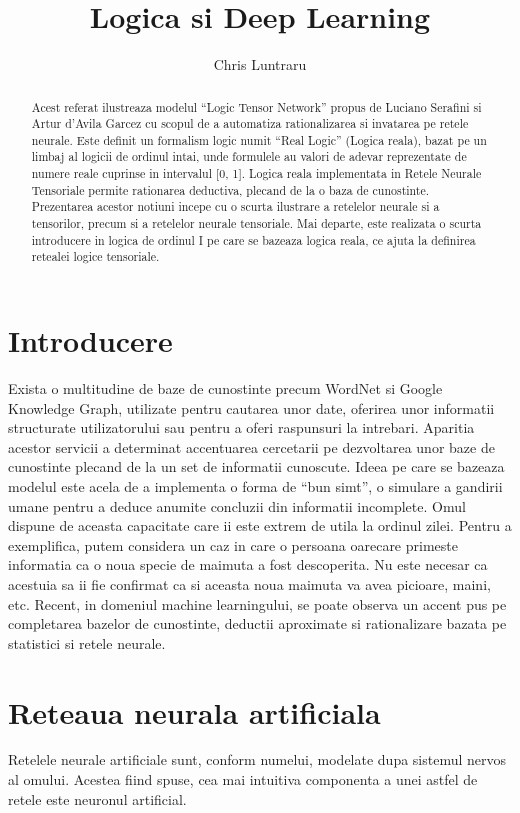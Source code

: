 \documentclass{article}
\begin{document}
\title{Logica si Deep Learning}
\author{Chris Luntraru}
\date{}
\maketitle

\begin{abstract}
Acest referat ilustreaza modelul ``Logic Tensor Network'' propus de Luciano Serafini si Artur d'Avila Garcez cu scopul de a automatiza rationalizarea si invatarea pe retele neurale. Este definit un formalism logic numit ``Real Logic'' (Logica reala), bazat pe un limbaj al logicii de ordinul intai, unde formulele au valori de adevar reprezentate de numere reale cuprinse in intervalul [0, 1]. Logica reala implementata in Retele Neurale Tensoriale permite rationarea deductiva, plecand de la o baza de cunostinte. Prezentarea acestor notiuni incepe cu o scurta ilustrare a retelelor neurale si a tensorilor, precum si a retelelor neurale tensoriale. Mai departe, este realizata o scurta introducere in logica de ordinul I pe care se bazeaza logica reala, ce ajuta la definirea retealei logice tensoriale.
\end{abstract}

\section{Introducere}
Exista o multitudine de baze de cunostinte precum WordNet si Google Knowledge Graph, utilizate pentru cautarea unor date, oferirea unor informatii structurate utilizatorului sau pentru a oferi raspunsuri la intrebari. Aparitia acestor servicii a determinat accentuarea cercetarii pe dezvoltarea unor baze de cunostinte plecand de la un set de informatii cunoscute. Ideea pe care se bazeaza modelul este acela de a implementa o forma de ``bun simt'', o simulare a gandirii umane pentru a deduce anumite concluzii din informatii incomplete. Omul dispune de aceasta capacitate care ii este extrem de utila la ordinul zilei. Pentru a exemplifica, putem considera un caz in care o persoana oarecare primeste informatia ca o noua specie de maimuta a fost descoperita. Nu este necesar ca acestuia sa ii fie confirmat ca si aceasta noua maimuta va avea picioare, maini, etc. \cite{NTN} Recent, in domeniul machine learningului, se poate observa un accent pus pe completarea bazelor de cunostinte, deductii aproximate si rationalizare bazata pe statistici si retele neurale. \cite{LTN}

\section{Reteaua neurala artificiala}
Retelele neurale artificiale sunt, conform numelui, modelate dupa sistemul nervos al omului. Acestea fiind spuse, cea mai intuitiva componenta a unei astfel de retele este neuronul artificial. \cite{Deep_Learning}
\end{document}
